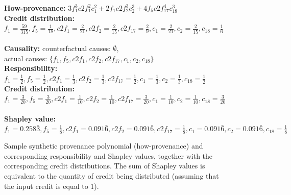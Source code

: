 \documentclass[preprint,12pt,sort&compress]{elsarticle}
\newcommand{\rtwo}[1]{\textcolor{reviewer2}{#1}}
\begin{document}
\begin{figure}
{\footnotesize{\bf How-provenance:}
$
3 f_1^3 c2f_1^2 c_1^2 + 2 f_1 c2f_2^3 c_2^3 + 4 f_5 c2f_{17}^4 c_{18}^3
$ }\\
\hspace{0.5in} 
{\footnotesize{\bf Credit distribution:}\\ $f_1 = \frac{59}{315}, f_5 = \frac{1}{18}, c2f_1 = \frac{2}{21}, c2f_2 = \frac{2}{15}, 
c2f_{17}=\frac{2}{9} , c_1 = \frac{2}{21}, c_2 = \frac{2}{15}, c_{18} = \frac{1}{6} 
$
}
\\
\\
{\footnotesize{\bf \rtwo{Causality:}}
\rtwo{counterfactual causes: $\emptyset$,\\
actual causes: $\{f_1, f_5, c2f_1, c2f_2, c2f_{17}, c_1, c_2, c_{18} \}$} \\
\rtwo{\textbf{Responsibility:}\\ 
$
f_1 = \frac{1}{2}, f_5 = \frac{1}{2}, c2f_1 = \frac{1}{3}, c2f_2 = \frac{1}{3}, 
c2f_{17}=\frac{1}{2} , c_1 = \frac{1}{3}, c_2 = \frac{1}{3}, c_{18} = \frac{1}{2}  
$
}}
\\
\rtwo{{\footnotesize{\bf Credit distribution:}\\
$
f_1 = \frac{3}{20}, f_5 = \frac{3}{20}, c2f_1 = \frac{1}{10}, c2f_2 = \frac{1}{10}, 
c2f_{17}=\frac{3}{20} , c_1 = \frac{1}{10}, c_2 = \frac{1}{10}, c_{18} = \frac{3}{20}  
$
}}
\\
\\
\rtwo{{\footnotesize{\bf Shapley value:}\\
$
f_1 = 0.258\bar{3}, f_5 = \frac{1}{8}, c2f_1 = 0.091\bar{6}, c2f_2 = 0.091\bar{6}, 
c2f_{17}=\frac{1}{8} , c_1 = 0.091\bar{6}, c_2 = 0.091\bar{6}, c_{18} = \frac{1}{8}  
$
}}

\caption{\rtwo{Sample synthetic provenance polynomial (how-provenance) and corresponding responsibility and Shapley values, together with the corresponding credit distributions. The sum of Shapley values is equivalent to the quantity of credit being distributed (assuming that the input credit is equal to $1$).}}
 \label{fig:syntheticDistributions}
 \end{figure}
\end{document}
